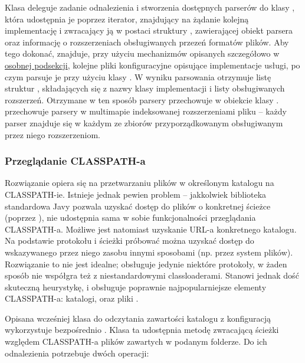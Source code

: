 Klasa  deleguje zadanie odnalezienia i stworzenia dostępnych parserów do klasy
, która udostępnia je poprzez iterator, znajdujący na żądanie kolejną
implementację i zwracający ją w postaci struktury , zawierającej obiekt parsera
oraz informację o rozszerzeniach obsługiwanych przezeń formatów plików. Aby tego dokonać,
 znajduje, przy użyciu mechanizmów opisanych szczegółowo w
\hyperref[sec:skaner_classpath]{osobnej podsekcji}, kolejne pliki konfiguracyjne opisujące
implementacje usługi, po czym parsuje je przy użyciu klasy . W wyniku
parsowania otrzymuje listę struktur , składających się z nazwy klasy
implementacji i listy obsługiwanych rozszerzeń. Otrzymane w ten sposób parsery 
przechowuje w obiekcie klasy .  przechowuje parsery w
multimapie indeksowanej rozszerzeniami pliku -- każdy parser znajduje się w każdym ze zbiorów
przyporządkowanym obsługiwanym przez niego rozszerzeniom.

\subsubsection{Przeglądanie CLASSPATH-a}
\label{sec:skaner_classpath}

Rozwiązanie opiera się na przetwarzaniu plików w określonym katalogu na CLASSPATH-ie. Istnieje
jednak pewien problem -- jakkolwiek biblioteka standardowa Javy pozwala uzyskać dostęp do plików o
konkretnej ścieżce (poprzez ), nie udostępnia sama w sobie
funkcjonalności przeglądania CLASSPATH-a. Możliwe jest natomiast uzyskanie URL-a konkretnego
katalogu. Na podstawie protokołu i ścieżki próbować można uzyskać dostęp do wskazywanego przez niego
zasobu innymi sposobami (np. przez system plików). Rozwiązanie to nie jest idealne; obsługuje
jedynie niektóre protokoły, w żaden sposób nie współgra też z niestandardowymi classloaderami.
Stanowi jednak dość skuteczną heurystykę, i obsługuje poprawnie najpopularniejsze elementy
CLASSPATH-a: katalogi, oraz pliki .



Opisana wcześniej klasa  do odczytania zawartości katalogu z konfiguracją
wykorzystuje bezpośrednio . Klasa ta udostępnia metodę zwracającą ścieżki
względem CLASSPATH-a plików zawartych w podanym folderze. Do ich odnalezienia potrzebuje dwóch
operacji:

